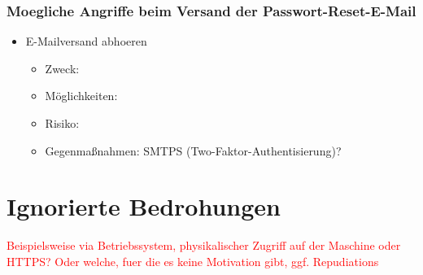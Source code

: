 \documentclass[12pt,DIV14,BCOR10mm,a4paper,twoside,parskip=half-,headsepline,headinclude,english,ngerman,bibliography=totocnumbered]{scrreprt}
\begin{document}
\subsubsection{Moegliche Angriffe beim Versand der Passwort-Reset-E-Mail}

\begin{itemize}
\item E-Mailversand abhoeren
  \begin{itemize}
  \item Zweck:
  \item Möglichkeiten:
  \item Risiko:
  \item Gegenmaßnahmen: SMTPS (Two-Faktor-Authentisierung)?
  \end{itemize}
\end{itemize}

\section{Ignorierte Bedrohungen}

\textcolor{red}{
Beispielsweise via Betriebssystem, physikalischer Zugriff auf der Maschine oder HTTPS?
Oder welche, fuer die es keine Motivation gibt, ggf. Repudiations
}

\printacronyms[title=Abkürzungsverzeichnis,toctitle=Abkürzungsverzeichnis]
\printglossary[type=main]

\listoffigures      %

\end{document}
